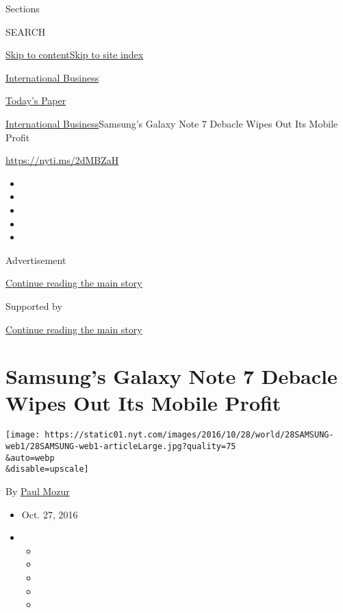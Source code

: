 Sections

SEARCH

\protect\hyperlink{site-content}{Skip to
content}\protect\hyperlink{site-index}{Skip to site index}

\href{https://www.nytimes.com/section/business}{International Business}

\href{https://myaccount.nytimes.com/auth/login?response_type=cookie\&client_id=vi}{}

\href{https://www.nytimes.com/section/todayspaper}{Today's Paper}

\href{/section/business}{International Business}\textbar{}Samsung's
Galaxy Note 7 Debacle Wipes Out Its Mobile Profit

\url{https://nyti.ms/2dMBZaH}

\begin{itemize}
\item
\item
\item
\item
\item
\end{itemize}

Advertisement

\protect\hyperlink{after-top}{Continue reading the main story}

Supported by

\protect\hyperlink{after-sponsor}{Continue reading the main story}

\hypertarget{samsungs-galaxy-note-7-debacle-wipes-out-its-mobile-profit}{%
\section{Samsung's Galaxy Note 7 Debacle Wipes Out Its Mobile
Profit}\label{samsungs-galaxy-note-7-debacle-wipes-out-its-mobile-profit}}

\texttt{[image: https://static01.nyt.com/images/2016/10/28/world/28SAMSUNG-web1/28SAMSUNG-web1-articleLarge.jpg?quality=75\\\&auto=webp\\\&disable=upscale]}

By \href{https://www.nytimes.com/by/paul-mozur}{Paul Mozur}

\begin{itemize}
\item
  Oct. 27, 2016
\item
  \begin{itemize}
  \item
  \item
  \item
  \item
  \item
  \end{itemize}
\end{itemize}


